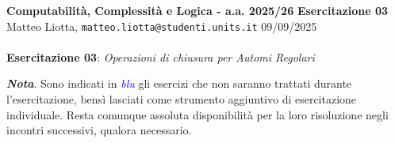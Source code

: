 \documentclass[a4paper,10pt]{article}
\newcommand{\EsercitazioneNum}{03}
\newcommand{\Data}{09/09/2025}
\begin{document}
\footnotesize  %

\noindent
\small \textbf{Computabilità, Complessità e Logica - a.a. 2025/26} \hfill \textbf{Esercitazione \EsercitazioneNum} \\[0.2cm]
\scriptsize Matteo Liotta, \texttt{matteo.liotta@studenti.units.it} \hfill \Data \\[0.2cm]

\noindent\makebox[\linewidth]{\rule{\linewidth}{0.4pt}} \\[1cm]


\noindent\Large \textbf{Esercitazione \EsercitazioneNum}: \textit{Operazioni di chiusura per Automi Regolari}
\begin{osservazioni}
    \textbf{\textit{Nota}}. Sono indicati in \textcolor{blue}{\textit{blu}} gli esercizi che non saranno trattati durante l'esercitazione, bensì lasciati come strumento aggiuntivo di esercitazione individuale. Resta comunque assoluta disponibilità per la loro risoluzione negli incontri successivi, qualora necessario.
\end{osservazioni}
\end{document}
